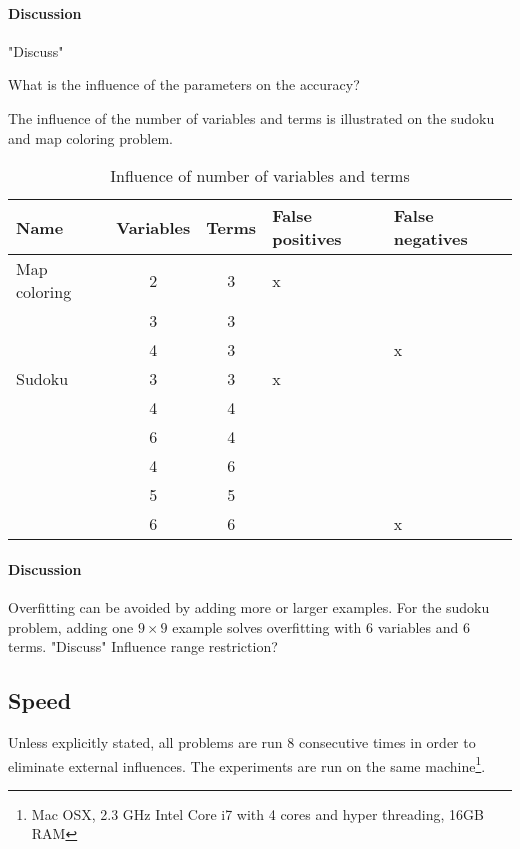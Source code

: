\paragraph{Discussion}
"Discuss"


\begin{question}
	What is the influence of the parameters on the accuracy?
	\label{q:cd_acc_influence}
\end{question}

\begin{experiment}
	\label{exp:cd_acc_influence_par}
	The influence of the number of variables and terms is illustrated on the sudoku and map coloring problem.

	\begin{table}[!htp]
		\begin{tabularx}{\textwidth}{lcc|XX}
			\textbf{Name} & \textbf{Variables} & \textbf{Terms}	& \textbf{False positives} & \textbf{False negatives} \\
			\toprule
			Map coloring & 2 & 3 & x &   \\
			& 3 & 3 &   &   \\
			& 4 & 3 &   & x \\
			\midrule
			Sudoku & 3 & 3 & x	&   \\
			& 4 & 4 &   	&   \\
			& 6 & 4 &   	&   \\
			& 4 & 6 &   	&   \\
			& 5 & 5 &   	&   \\
			& 6 & 6 &   	& x
		\end{tabularx}
		\label{tbl:cd_acc_influence}
		\caption{Influence of number of variables and terms}
	\end{table}

\end{experiment}

\paragraph{Discussion}
	Overfitting can be avoided by adding more or larger examples.
	For the sudoku problem, adding one $9 \times 9$ example solves overfitting with $6$ variables and $6$ terms.
"Discuss"
Influence range restriction?


\subsection{Speed}

Unless explicitly stated, all problems are run $8$ consecutive times in order to eliminate external influences.
The experiments are run on the same machine\footnote{Mac OSX, 2.3 GHz Intel Core i7 with 4 cores and hyper threading, 16GB RAM}.

